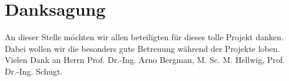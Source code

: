 \documentclass[conference,twocolumn]{IEEEtran}
\begin{document}
\section*{Danksagung}
An dieser Stelle möchten wir allen beteiligten für dieses tolle Projekt danken. Dabei wollen wir die besonders gute Betreuung während der Projekte loben. Vielen Dank an Herrn Prof. Dr.-Ing. Arno Bergman, M. Sc. M. Hellwig, Prof. Dr.-Ing. Schugt.

\ifCLASSOPTIONcaptionsoff
  \newpage
\fi



%
%
%



\printbibliography




% 
\end{document}
